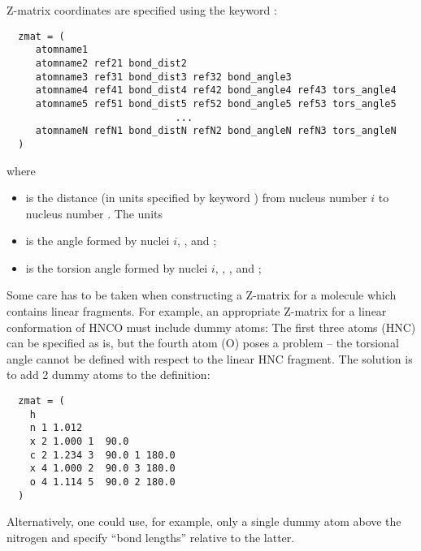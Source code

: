 \noindent
Z-matrix coordinates are specified using the keyword :
\begin{verbatim}
  zmat = (
     atomname1
     atomname2 ref21 bond_dist2
     atomname3 ref31 bond_dist3 ref32 bond_angle3 
     atomname4 ref41 bond_dist4 ref42 bond_angle4 ref43 tors_angle4 
     atomname5 ref51 bond_dist5 ref52 bond_angle5 ref53 tors_angle5 
                             ...                
     atomnameN refN1 bond_distN refN2 bond_angleN refN3 tors_angleN 
  )
\end{verbatim}
where
\begin{itemize}
\item {} is the distance (in units specified by
keyword ) from nucleus number $i$ to
nucleus number . The units 
\item {} is the angle formed by nuclei $i$,
, and ;
\item {} is the torsion angle formed by nuclei $i$,
, , and ;
\end{itemize}
Some care has to be taken when constructing a Z-matrix for a molecule
which contains linear fragments. For example, an appropriate Z-matrix
for a linear conformation of HNCO must include dummy atoms: The first
three atoms (HNC) can be specified as is, but the fourth atom (O)
poses a problem -- the torsional angle cannot be defined with respect
to the linear HNC fragment. The solution is to add 2 dummy atoms to
the definition:
\begin{verbatim}
  zmat = (
    h
    n 1 1.012
    x 2 1.000 1  90.0
    c 2 1.234 3  90.0 1 180.0
    x 4 1.000 2  90.0 3 180.0
    o 4 1.114 5  90.0 2 180.0
  )
\end{verbatim}
Alternatively, one could use, for example, only a single dummy atom above the
nitrogen and specify ``bond lengths'' relative to the latter.

